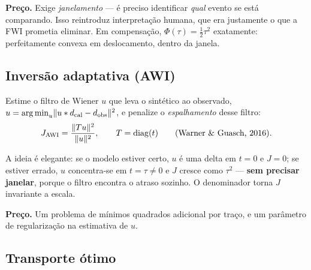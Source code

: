 \documentclass[11pt,a4paper,oneside]{report}
\begin{document}
\textbf{Pre\c{c}o.} Exige \emph{janelamento} --- \'e preciso identificar
\emph{qual} evento se est\'a comparando. Isso reintroduz interpreta\c{c}\~ao
humana, que era justamente o que a FWI prometia eliminar. Em compensa\c{c}\~ao,
$\Phi(\tau) = \tfrac12\tau^{2}$ exatamente: perfeitamente convexa em deslocamento,
dentro da janela.

\subsection*{Invers\~ao adaptativa (AWI)}

Estime o filtro de Wiener $u$ que leva o sint\'etico ao observado,
$u = \operatorname*{arg\,min}_u \lVert u * d_{\text{cal}} - d_{\text{obs}} \rVert^{2}$, e penalize o
\emph{espalhamento} desse filtro:
\begin{equation}
J_{\text{AWI}} = \frac{\lVert T u \rVert^{2}}{\lVert u \rVert^{2}},
\qquad T = \operatorname{diag}(t)
\qquad\text{(Warner \& Guasch, 2016)} .
\end{equation}

A ideia \'e elegante: se o modelo estiver certo, $u$ \'e uma delta em
$t=0$ e $J = 0$; se estiver errado, $u$ concentra-se em $t = \tau \ne 0$ e $J$
cresce como $\tau^{2}$ --- \textbf{sem precisar janelar}, porque o filtro
encontra o atraso sozinho. O denominador torna $J$ invariante a escala.

\textbf{Pre\c{c}o.} Um problema de m\'inimos quadrados adicional por
tra\c{c}o, e um par\^ametro de regulariza\c{c}\~ao na estimativa de $u$.

\subsection*{Transporte \'otimo}
\end{document}

